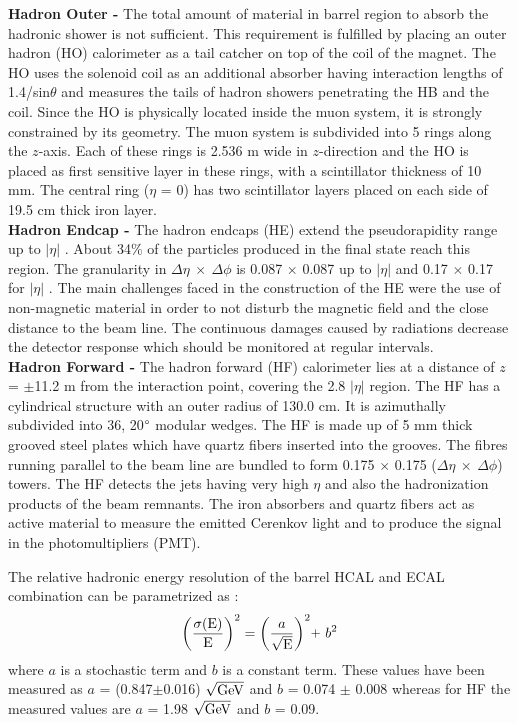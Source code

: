 {\bf Hadron Outer -} The total amount of material in barrel region to absorb the hadronic shower is not sufficient. This requirement is fulfilled by placing an outer hadron (HO) calorimeter as a tail catcher on top of the coil of the magnet. The HO uses the solenoid coil as an additional absorber having interaction lengths of 1.4/sin$\theta$ and measures the tails of hadron showers penetrating the HB and the coil. Since the HO is physically located inside the muon system, it is strongly constrained by its geometry. The muon system is subdivided into 5 rings along the $z$-axis. Each of these rings is 2.536 m wide in $z$-direction and the HO is placed as first sensitive layer in these rings, with a scintillator thickness of 10 mm. The central ring ($\eta$ = 0) has two scintillator layers placed on each side of 19.5 cm thick iron layer.\\ \newline
{\bf Hadron Endcap -} The hadron endcaps (HE) extend the pseudorapidity range up to $|\eta|$ . About 34\% of the particles produced in the final state reach this region. The granularity in $\Delta\eta~\times~\Delta\phi$ is 0.087 $\times$ 0.087 up to $|\eta|$  and 0.17 $\times$ 0.17 for $|\eta|$ . The main challenges faced in the construction of the HE were the use of non-magnetic material in order to not disturb the magnetic field and the close distance to the beam line. The continuous damages caused by radiations decrease the detector response which should be monitored at regular intervals. \\ \newline
{\bf Hadron Forward -} The hadron forward (HF) calorimeter lies at a distance of $z$ = $\pm$11.2 m from the interaction point, covering the 2.8 \ls $|\eta|$  region. The HF has a cylindrical structure with an outer radius of 130.0 cm. It is azimuthally subdivided into 36, 20$\degree$ modular wedges. The HF is made up of 5 mm thick grooved steel plates which have quartz fibers inserted into the grooves. The fibres running parallel to the beam line are bundled to form 0.175 $\times$ 0.175 ($\Delta\eta~\times~\Delta\phi$) towers. The HF detects the jets having very high $\eta$ and also the hadronization products of the beam remnants. The iron absorbers and quartz fibers act as active material to measure the emitted Cerenkov light and to produce the signal in the photomultipliers (PMT).

The relative hadronic energy resolution of the barrel HCAL and ECAL combination can be parametrized as :
\begin{equation}
{\rm \bigg(\frac{\sigma(E)}{E}\bigg)^2} = \bigg(\frac{a}{\sqrt{\rm E}}\bigg)^2 \plus b^2
\end{equation}
where $a$ is a stochastic term and $b$ is a constant term. These values have been measured \cite{Chatrchyan:2009ag} as $a$ = (0.847$\pm$0.016) $\sqrt{\rm GeV}$ and $b$ = 0.074 $\pm$ 0.008 whereas for HF the measured values are $a$ = 1.98 $\sqrt{\rm GeV}$ and $b$ = 0.09.

